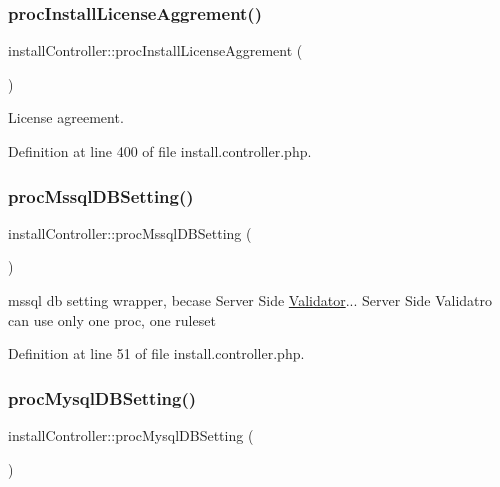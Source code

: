 \subsubsection{\texorpdfstring{proc\+Install\+License\+Aggrement()}{procInstallLicenseAggrement()}}
{\footnotesize\ttfamily install\+Controller\+::proc\+Install\+License\+Aggrement (\begin{DoxyParamCaption}{ }\end{DoxyParamCaption})}



License agreement. 



Definition at line 400 of file install.\+controller.\+php.

\mbox{\label{classinstallController_a583b9b74e93bf6a762a7bd6d08e2b23a}} 
\subsubsection{\texorpdfstring{proc\+Mssql\+D\+B\+Setting()}{procMssqlDBSetting()}}
{\footnotesize\ttfamily install\+Controller\+::proc\+Mssql\+D\+B\+Setting (\begin{DoxyParamCaption}{ }\end{DoxyParamCaption})}



mssql db setting wrapper, becase Server Side \hyperlink{classValidator}{Validator}... Server Side Validatro can use only one proc, one ruleset 



Definition at line 51 of file install.\+controller.\+php.

\mbox{\label{classinstallController_a9d46a8423a90109be5dc1edf8238630e}} 
\subsubsection{\texorpdfstring{proc\+Mysql\+D\+B\+Setting()}{procMysqlDBSetting()}}
{\footnotesize\ttfamily install\+Controller\+::proc\+Mysql\+D\+B\+Setting (\begin{DoxyParamCaption}{ }\end{DoxyParamCaption})}



